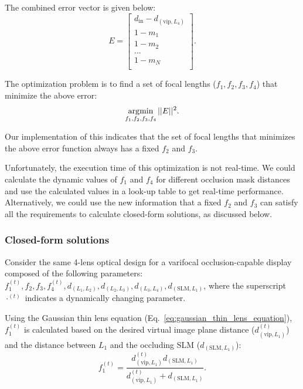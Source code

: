 The combined error vector is given below:
\begin{equation}
    E = 
    \begin{bmatrix} 
    d_{\text{in}} - d_{(\text{vip},L_4)}\\ 
    1 - m_1\\ 
    1 - m_2\\ 
    ...\\ 
    1 - m_N\\ 
    \end{bmatrix}.
    \label{eq:optimization_error}
\end{equation}

The optimization problem is to find a set of focal lengths ($f_1,f_2,f_3,f_4$) that minimize the above error:
\begin{equation}
\operatorname*{arg\!\min}_{f_1,f_2,f_3,f_4} ||E||^2.
\end{equation}

Our implementation of this indicates that the set of focal lengths that minimizes the above error function always has a fixed $f_2$ and $f_3$. 

Unfortunately, the execution time of this optimization is not real-time. We could calculate the dynamic values of $f_1$ and $f_4$ for different occlusion mask distances and use the calculated values in a look-up table to get real-time performance. Alternatively, we could use the new information that a fixed $f_2$ and $f_3$ can satisfy all the requirements to calculate closed-form solutions, as discussed below.

\subsubsection{Closed-form solutions}
\label{sec:optical_design_closed_form}

Consider the same 4-lens optical design for a varifocal occlusion-capable display composed of the following parameters: $f_1^{(t)}, f_2, f_3, f_4^{(t)}, d_{(L_1,L_2)}, d_{(L_2,L_3)}, d_{(L_3,L_4)}, d_{(\text{SLM},L_1)}$, where the superscript $\cdot ^{(t)}$ indicates a dynamically changing parameter. 


Using the Gaussian thin lens equation (Eq.~\eqref{eq:gaussian_thin_lens_equation}), $f_1^{(t)}$ is calculated based on the desired virtual image plane distance ($d_{(\text{vip},L_1)}^{(t)}$) and the distance between $L_1$ and the occluding SLM ($d_{(\text{SLM},L_1)}$):
\begin{equation}
    f_1^{(t)} = \frac{d_{(\text{vip},L_1)}^{(t)} d_{(\text{SLM},L_1)} }{d_{(\text{vip},L_1)}^{(t)} + d_{(\text{SLM},L_1)} }.
    \label{eq:closed_form_f_1}
\end{equation}

